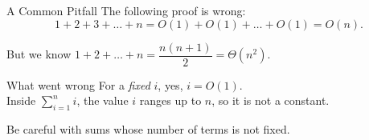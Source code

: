 \documentclass[10pt,aspectratio=169]{beamer}
\begin{document}
\begin{frame}{A Common Pitfall}
  The following proof is \alert{wrong}:
  \[
    1 + 2 + 3 + \ldots + n = O(1) + O(1) + \ldots + O(1) = O(n).
  \]

  \bigskip
  But we know $1 + 2 + \ldots + n = \dfrac{n(n+1)}{2} = \Theta(n^2)$.

  \bigskip
  \begin{alertblock}{What went wrong}
    For a \emph{fixed} $i$, yes, $i = O(1)$.\\
    Inside $\sum_{i=1}^{n} i$, the value $i$ ranges up to $n$, so it is \alert{not} a constant.
  \end{alertblock}

  \bigskip
  \begin{center}
    \small Be careful with sums whose number of terms is not fixed.
  \end{center}
\end{frame}
\end{document}
